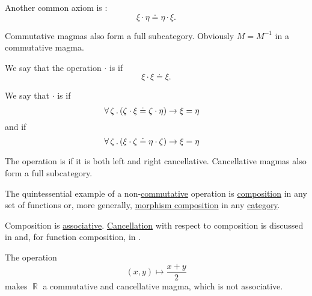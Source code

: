 \begin{definition}
\begin{thmenum}[resume=def:magma]
     Another common axiom is :
    \begin{equation}\label{eq:def:magma/commutative}
      \xi \cdot \eta \doteq \eta \cdot \xi.
    \end{equation}

    Commutative magmas also form a full subcategory. Obviously \( M = M^{-1} \) in a commutative magma.

     We say that the operation \( \cdot \) is  if
    \begin{equation}\label{eq:def:magma/idempotent}
      \xi \cdot \xi \doteq \xi.
    \end{equation}

     We say that \( \cdot \) is  if
    \begin{equation}\label{eq:def:magma/cancellative/left}
      \forall \thinspace \zeta \thinspace . \thinspace (\zeta \cdot \xi \doteq \zeta \cdot \eta) \rightarrow \xi = \eta
      \quad
    \end{equation}
    and  if
    \begin{equation}\label{eq:def:magma/cancellative/right}
      \forall \thinspace \zeta \thinspace . \thinspace (\xi \cdot \zeta \doteq \eta \cdot \zeta) \rightarrow \xi = \eta
      \quad
    \end{equation}

    The operation is  if it is both left and right cancellative. Cancellative magmas also form a full subcategory.
  \end{thmenum}
\end{definition}

\begin{example}\label{ex:def:magma}
  \hfill
  \begin{thmenum}
     The quintessential example of a non-\hyperref[def:magma/commutative]{commutative} operation is \hyperref[def:multi_valued_function/composition]{composition} in any set of functions or, more generally, \hyperref[def:category/composition]{morphism composition} in any \hyperref[def:category]{category}.

    Composition is \hyperref[def:magma/associative]{associative}. \hyperref[def:magma/cancellative]{Cancellation} with respect to composition is discussed in  and, for function composition, in .

     The operation
    \begin{equation*}
      (x, y) \mapsto \dfrac {x + y} 2
    \end{equation*}
    makes \( \BbbR \) a commutative and cancellative magma, which is not associative.
  \end{thmenum}
\end{example}

